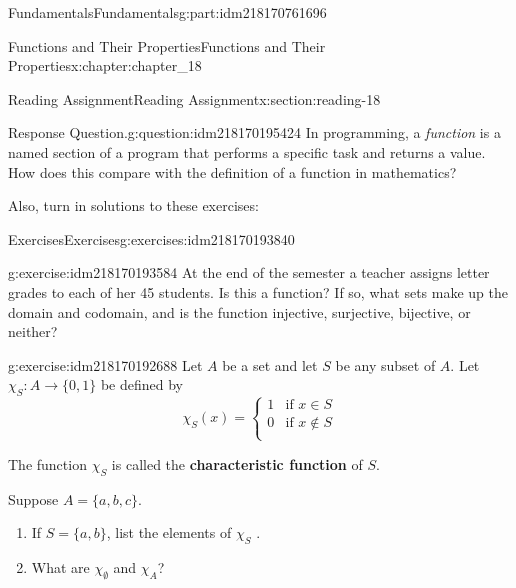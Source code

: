 \documentclass[oneside,10pt,]{book}
\newcommand{\terminology}[1]{\textbf{#1}}
\numberwithin{equation}{section}
\begin{document}
\begin{partptx}{Fundamentals}{}{Fundamentals}{}{}{g:part:idm218170761696}
\begin{chapterptx}{Functions and Their Properties}{}{Functions and Their Properties}{}{}{x:chapter:chapter_18}
\begin{sectionptx}{Reading Assignment}{}{Reading Assignment}{}{}{x:section:reading-18}
\begin{question}{Response Question.}{g:question:idm218170195424}
In programming, a \emph{function} is a named section of a program that performs a specific task and returns a value.  How does this compare with the definition of a function in mathematics?%
\end{question}
Also, turn in solutions to these exercises:%
%
%
\typeout{************************************************}
\typeout{************************************************}
%
\begin{exercises-subsection-numberless}{Exercises}{}{Exercises}{}{}{g:exercises:idm218170193840}
\par\medskip\noindent%
%
\begin{exercisegroup}
\begin{divisionexerciseeg}{1}{}{}{g:exercise:idm218170193584}%
At the end of the semester a teacher assigns letter grades to each of her 45 students. Is this a function? If so, what sets make up the domain and codomain, and is the function injective, surjective, bijective, or neither?%
\end{divisionexerciseeg}%
\begin{divisionexerciseeg}{2}{}{}{g:exercise:idm218170192688}%
Let \(A\) be a set and let \(S\) be any subset of \(A\). Let \(\chi_S: A\to \{0,1\}\) be defined by%
\begin{equation*}
\chi_S(x)= \left\{
\begin{array}{cc}
1 & \textrm{if } x\in S \\
0 & \textrm{if } x\notin S \\
\end{array}
\right.
\end{equation*}
%
\par
The function \(\chi_S\) is called the \terminology{characteristic function} of \(S\).%
\par
Suppose \(A = \{a, b, c\}\).%
\begin{enumerate}[label=(\alph*)]
\item{}If  \(S = \{a, b\}\), list the elements of \(\chi_S\) .%
\item{}What are \(\chi_{\emptyset}\) and \(\chi_A\)?%
\end{enumerate}
%
\end{divisionexerciseeg}%
\end{exercisegroup}
\par\medskip\noindent
\end{exercises-subsection-numberless}
\end{sectionptx}
%
%
\typeout{************************************************}

\end{chapterptx}
\end{partptx}
\end{document}
